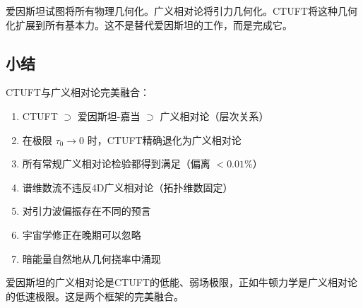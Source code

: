 \begin{remark}[完成爱因斯坦的梦想]
爱因斯坦试图将所有物理几何化。广义相对论将引力几何化。CTUFT将这种几何化扩展到所有基本力。这不是替代爱因斯坦的工作，而是完成它。
\end{remark}

\subsection{小结}

CTUFT与广义相对论完美融合：
\begin{enumerate}
    \item CTUFT $\supset$ 爱因斯坦-嘉当 $\supset$ 广义相对论（层次关系）
    \item 在极限 $\tau_0 \to 0$ 时，CTUFT精确退化为广义相对论
    \item 所有常规广义相对论检验都得到满足（偏离 $< 0.01\%$）
    \item 谱维数流不违反4D广义相对论（拓扑维数固定）
    \item 对引力波偏振存在不同的预言
    \item 宇宙学修正在晚期可以忽略
    \item 暗能量自然地从几何挠率中涌现
\end{enumerate}

爱因斯坦的广义相对论是CTUFT的低能、弱场极限，正如牛顿力学是广义相对论的低速极限。这是两个框架的完美融合。
